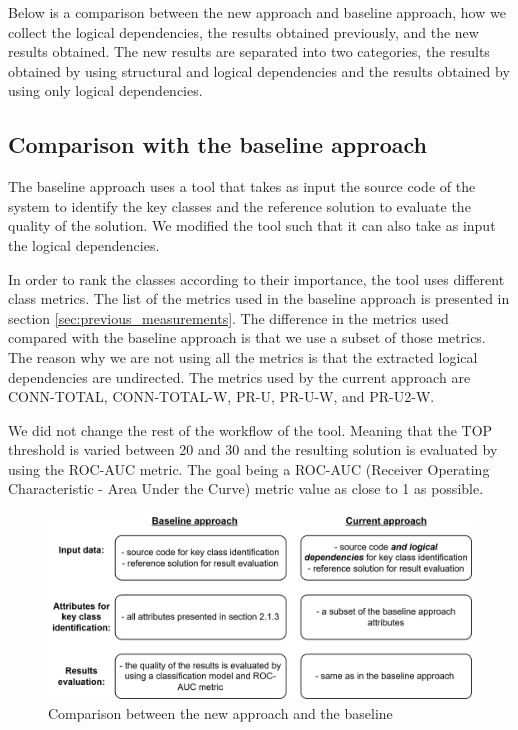 \documentclass[12pt, a4paper, twoside]{report}
\begin{document}
Below is a comparison between the new approach and baseline approach, how we collect the logical dependencies, the results obtained previously, and the new results obtained. 
The new results are separated into two categories, the results obtained by using structural and logical dependencies and the results obtained by using only logical dependencies. 



\subsection{Comparison with the baseline approach}
\label{sec:comparison}

The baseline approach uses a tool that takes as input the source code of the system to identify the key classes and the reference solution to evaluate the quality of the solution. 
We modified the tool such that it can also take as input the logical dependencies. 

In order to rank the classes according to their importance, the tool uses different class metrics. The list of the metrics used in the baseline approach is presented in section \ref{sec:previous_measurements}.  
The difference in the metrics used compared with the baseline approach is that we use a subset of those metrics. The reason why we are not using all the metrics is that the extracted logical dependencies are undirected. The metrics used by the current approach are CONN-TOTAL, CONN-TOTAL-W, PR-U, PR-U-W, and PR-U2-W.

We did not change the rest of the workflow of the tool. Meaning that the TOP threshold is varied between 20 and 30 and the resulting solution is evaluated by using the ROC-AUC metric. The goal being a ROC-AUC (Receiver Operating Characteristic - Area Under the Curve) metric value as close to 1 as possible.

\begin{figure}[H]
\centering
\includegraphics[width=\textwidth]{baseline_comparison.png}
\caption{ Comparison between the new approach and the baseline }
\label{fig:baseline_comparison}
\centering
\end{figure}
\end{document}
